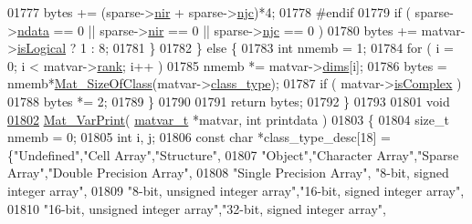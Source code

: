 \begin{DoxyCode}
{{{{{{{{{{{{{{{{{{{{{{{{{{{{{{01777             bytes += (sparse->\hyperlink{group___m_a_t_aa64636ad57cf87f7a28ff5018437a850}{nir} + sparse->\hyperlink{group___m_a_t_a482d8e4b40aa975f0c1daf146ebe08a4}{njc})*4;
01778 \textcolor{preprocessor}{#endif}
01779             \textcolor{keywordflow}{if} ( sparse->\hyperlink{group___m_a_t_a1beb8a8c58a808207cbea650563a9b63}{ndata} == 0 || sparse->\hyperlink{group___m_a_t_aa64636ad57cf87f7a28ff5018437a850}{nir} == 0 || sparse->\hyperlink{group___m_a_t_a482d8e4b40aa975f0c1daf146ebe08a4}{njc} == 0 )
01780                 bytes += matvar->\hyperlink{group___m_a_t_a866c1539e68073a837833d74cd4a65be}{isLogical} ? 1 : 8;
01781         \}
01782     \} \textcolor{keywordflow}{else} \{
01783         \textcolor{keywordtype}{int} nmemb = 1;
01784         \textcolor{keywordflow}{for} ( i = 0; i < matvar->\hyperlink{group___m_a_t_a84ba70c96ded13cc555fa75b768d9921}{rank}; i++ )
01785             nmemb *= matvar->\hyperlink{group___m_a_t_a8e01234e1c862ce3472bb37f5a09b92c}{dims}[i];
01786         bytes = nmemb*\hyperlink{group___m_a_t_ga2bf682f015b22fa796a8885e997661e7}{Mat\_SizeOfClass}(matvar->\hyperlink{group___m_a_t_aff13035bf3265dd7d9425e5d40c839d4}{class\_type});
01787         \textcolor{keywordflow}{if} ( matvar->\hyperlink{group___m_a_t_aeb03b3a69f108dc05470b00443a43739}{isComplex} )
01788             bytes *= 2;
01789     \}
01790 
01791     \textcolor{keywordflow}{return} bytes;
01792 \}
01793 
01801 \textcolor{keywordtype}{void}
\hyperlink{group___m_a_t_ga9100c145e338b84b55d5d0795d5d390a}{01802} \hyperlink{group___m_a_t_ga9100c145e338b84b55d5d0795d5d390a}{Mat\_VarPrint}( \hyperlink{group___m_a_t_structmatvar__t}{matvar\_t} *matvar, \textcolor{keywordtype}{int} printdata )
01803 \{
01804     \textcolor{keywordtype}{size\_t} nmemb = 0;
01805     \textcolor{keywordtype}{int} i, j;
01806     \textcolor{keyword}{const} \textcolor{keywordtype}{char} *class\_type\_desc[18] = \{\textcolor{stringliteral}{"Undefined"},\textcolor{stringliteral}{"Cell Array"},\textcolor{stringliteral}{"Structure"},
01807        \textcolor{stringliteral}{"Object"},\textcolor{stringliteral}{"Character Array"},\textcolor{stringliteral}{"Sparse Array"},\textcolor{stringliteral}{"Double Precision Array"},
01808        \textcolor{stringliteral}{"Single Precision Array"}, \textcolor{stringliteral}{"8-bit, signed integer array"},
01809        \textcolor{stringliteral}{"8-bit, unsigned integer array"},\textcolor{stringliteral}{"16-bit, signed integer array"},
01810        \textcolor{stringliteral}{"16-bit, unsigned integer array"},\textcolor{stringliteral}{"32-bit, signed integer array"},
}}}}}}}}}}}}}}}}}}}}}}}}}}}}}}
\end{DoxyCode}

